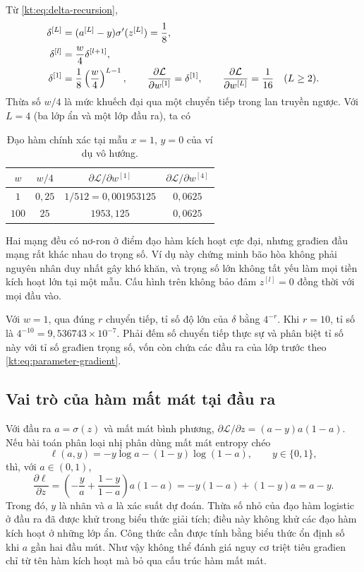 Từ \eqref{kt:eq:delta-recursion},
\begin{align}
 \delta^{[L]}&=(a^{[L]}-y)\sigma'(z^{[L]})=\frac18,\notag\\
 \delta^{[l]}&=\frac{w}{4}\delta^{[l+1]},\notag\\
 \delta^{[1]}&=\frac18\left(\frac{w}{4}\right)^{L-1},\qquad
 \frac{\partial\mathcal L}{\partial w^{[1]}}=\delta^{[1]},\qquad
 \frac{\partial\mathcal L}{\partial w^{[L]}}=\frac1{16}\quad(L\geq2).
 \label{kt:eq:scalar-gradient}
\end{align}
Thừa số $w/4$ là mức khuếch đại qua một chuyển tiếp trong lan
truyền ngược. Với $L=4$ (ba lớp ẩn và một lớp đầu ra), ta có
\begin{table}[htbp]
\centering
\caption{Đạo hàm chính xác tại mẫu $x=1$, $y=0$ của ví dụ vô hướng.}
\label{kt:tab:scalar}
\begin{tabular}{@{}cccc@{}}
\toprule
$w$&$w/4$&$\partial\mathcal L/\partial w^{[1]}$
 &$\partial\mathcal L/\partial w^{[4]}$\\
\midrule
$1$&$0{,}25$&$1/512=0{,}001953125$&$0{,}0625$\\
$100$&$25$&$1953{,}125$&$0{,}0625$\\
\bottomrule
\end{tabular}
\end{table}
Hai mạng đều có nơ-ron ở điểm đạo hàm kích hoạt cực đại, nhưng
građien đầu mạng rất khác nhau do trọng số. Ví dụ này chứng minh
bão hòa không phải nguyên nhân duy nhất gây khó khăn, và trọng số
lớn không tất yếu làm mọi tiền kích hoạt lớn tại một mẫu.
Cấu hình trên không bảo đảm $z^{[l]}=0$ đồng thời với mọi đầu vào.

Với $w=1$, qua đúng $r$ chuyển tiếp, tỉ số độ lớn của $\delta$
bằng $4^{-r}$. Khi $r=10$, tỉ số là
$4^{-10}=9{,}536743\times10^{-7}$. Phải đếm số chuyển tiếp thực
sự và phân biệt tỉ số này với tỉ số građien trọng số, vốn còn chứa
các đầu ra của lớp trước theo \eqref{kt:eq:parameter-gradient}.

\subsection{Vai trò của hàm mất mát tại đầu ra}

Với đầu ra $a=\sigma(z)$ và mất mát bình phương,
$\partial\mathcal L/\partial z=(a-y)a(1-a)$. Nếu bài toán phân
loại nhị phân dùng mất mát entropy chéo
\begin{equation}
 \ell(a,y)=-y\log a-(1-y)\log(1-a),\qquad y\in\{0,1\},
 \label{kt:eq:cross-entropy}
\end{equation}
thì, với $a\in(0,1)$,
\begin{equation}
 \frac{\partial\ell}{\partial z}
 =\left(-\frac ya+\frac{1-y}{1-a}\right)a(1-a)
 =-y(1-a)+(1-y)a=a-y.
 \label{kt:eq:cross-entropy-gradient}
\end{equation}
Trong đó, $y$ là nhãn và $a$ là xác suất dự đoán. Thừa số nhỏ của
đạo hàm logistic ở đầu ra đã được khử trong biểu thức giải tích;
điều này không khử các đạo hàm kích hoạt ở những lớp ẩn.
Công thức cần được tính bằng biểu thức ổn định số khi $a$ gần hai
đầu mút. Như vậy không thể đánh giá nguy cơ triệt tiêu građien chỉ
từ tên hàm kích hoạt mà bỏ qua cấu trúc hàm mất mát.

